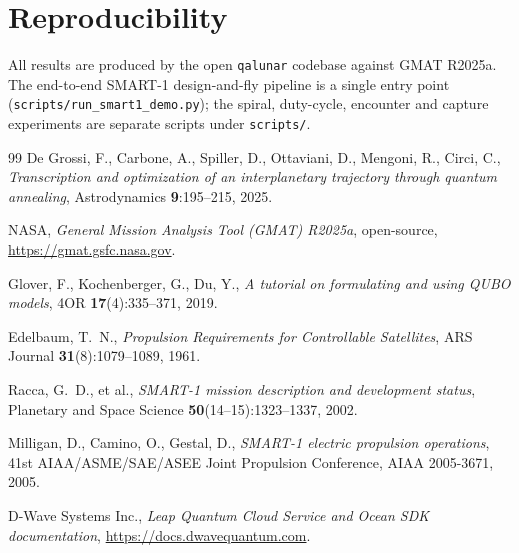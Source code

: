 \documentclass[11pt,a4paper]{article}
\theoremstyle{plain}
\begin{document}
\section*{Reproducibility}
All results are produced by the open \texttt{qalunar} codebase against GMAT
R2025a. The end-to-end SMART-1 design-and-fly pipeline is a single entry point
(\texttt{scripts/run\_smart1\_demo.py}); the spiral, duty-cycle, encounter and
capture experiments are separate scripts under \texttt{scripts/}.

\begin{thebibliography}{99}
  De Grossi, F., Carbone, A., Spiller, D., Ottaviani, D., Mengoni, R., Circi, C.,
  \emph{Transcription and optimization of an interplanetary trajectory through
  quantum annealing}, Astrodynamics \textbf{9}:195--215, 2025.

  NASA, \emph{General Mission Analysis Tool (GMAT) R2025a}, open-source,
  \url{https://gmat.gsfc.nasa.gov}.

  Glover, F., Kochenberger, G., Du, Y., \emph{A tutorial on formulating and
  using QUBO models}, 4OR \textbf{17}(4):335--371, 2019.

  Edelbaum, T.~N., \emph{Propulsion Requirements for Controllable Satellites},
  ARS Journal \textbf{31}(8):1079--1089, 1961.

  Racca, G.~D., et al., \emph{SMART-1 mission description and development
  status}, Planetary and Space Science \textbf{50}(14--15):1323--1337, 2002.

  Milligan, D., Camino, O., Gestal, D., \emph{SMART-1 electric propulsion
  operations}, 41st AIAA/ASME/SAE/ASEE Joint Propulsion Conference,
  AIAA 2005-3671, 2005.

  D-Wave Systems Inc., \emph{Leap Quantum Cloud Service and Ocean SDK
  documentation}, \url{https://docs.dwavequantum.com}.
\end{thebibliography}
\end{document}
